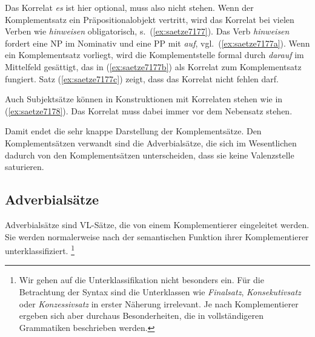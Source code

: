 Das Korrelat \textit{es} ist hier optional, muss also nicht stehen.
Wenn der Komplementsatz ein Präpositionalobjekt vertritt, wird das Korrelat bei vielen Verben wie \textit{hinweisen} obligatorisch, s.\ (\ref{ex:saetze7177}).
Das Verb \textit{hinweisen} fordert eine NP im Nominativ und eine PP mit \textit{auf}, vgl.\ (\ref{ex:saetze7177a}).
Wenn ein Komplementsatz vorliegt, wird die Komplementstelle formal durch \textit{darauf} im Mittelfeld gesättigt, das in (\ref{ex:saetze7177b}) als Korrelat zum Komplementsatz fungiert.
Satz (\ref{ex:saetze7177c}) zeigt, dass das Korrelat nicht fehlen darf.

\begin{exe}
  \ex\label{ex:saetze7177}
  \begin{xlist}
  \end{xlist}
\end{exe}

Auch Subjektsätze können in Konstruktionen mit Korrelaten stehen wie in (\ref{ex:saetze7178}).
Das Korrelat muss dabei immer vor dem Nebensatz stehen.

\begin{exe}
  \ex\label{ex:saetze7178}
  \begin{xlist}
  \end{xlist}
\end{exe}

Damit endet die sehr knappe Darstellung der Komplementsätze.
Den Komplementsätzen verwandt sind die Adverbialsätze, die sich im Wesentlichen dadurch von den Komplementsätzen unterscheiden, dass sie keine Valenzstelle saturieren.

\subsection{Adverbialsätze}

\label{sec:adverbialsaetze}

Adverbialsätze sind VL-Sätze, die von einem Komplementierer eingeleitet werden.
Sie werden normalerweise nach der semantischen Funktion ihrer Komplementierer unterklassifiziert.%
\footnote{Wir gehen auf die Unterklassifikation nicht besonders ein.
Für die Betrachtung der Syntax sind die Unterklassen wie \textit{Finalsatz}, \textit{Konsekutivsatz} oder \textit{Konzessivsatz} in erster Näherung irrelevant.
Je nach Komplementierer ergeben sich aber durchaus Besonderheiten, die in vollständigeren Grammatiken beschrieben werden.}

